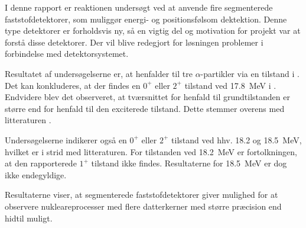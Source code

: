 I denne rapport er reaktionen undersøgt ved at anvende fire segmenterede faststofdetektorer, som
muliggør energi- og positionsfølsom dektektion. Denne type detektorer er forholdsvis ny, så en
vigtig del og motivation for projekt var at forstå disse detektorer. Der vil blive redegjort for
løsningen problemer i forbindelse med detektorsystemet.


Resultatet af undersøgelserne er, at \Carb henfalder til tre $\alpha$-partikler via en tilstand i
\Be. Det kan konkluderes, at der findes en $0^{+}$ eller $2^{+}$ tilstand ved \SI{17.8}{\MeV} i
\Carb. Endvidere blev det observeret, at tværsnittet for henfald til grundtilstanden er større end for
henfald til den exciterede tilstand. Dette stemmer overens med litteraturen \cite{States}.

Undersøgelserne indikerer også en $0^{+}$ eller $2^{+}$ tilstand ved hhv. \num{18.2} og
\SI{18.5}{\MeV}, hvilket er i strid med litteraturen. For tilstanden ved \SI{18.2}{\MeV} er
fortolkningen, at den rapporterede $1^{+}$ tilstand ikke findes. Resultaterne for \SI{18.5}{\MeV} er
dog ikke endegyldige.

Resultaterne viser, at segmenterede faststofdetektorer giver mulighed for at observere
nukleareprocesser med flere datterkerner med større præcision end hidtil muligt. 




\endgroup
